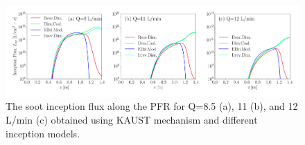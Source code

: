 \begin{figure}[H]
	\centering
	\includegraphics[width=1\textwidth]{Figures/Results/PFR/inception.pdf}
	\caption{The soot inception flux along the PFR for Q=8.5 (a), 11 (b), and 12 L/min (c) obtained using KAUST mechanism and different inception models.}
	\label{fig:pfr_Iinc} 
\end{figure}